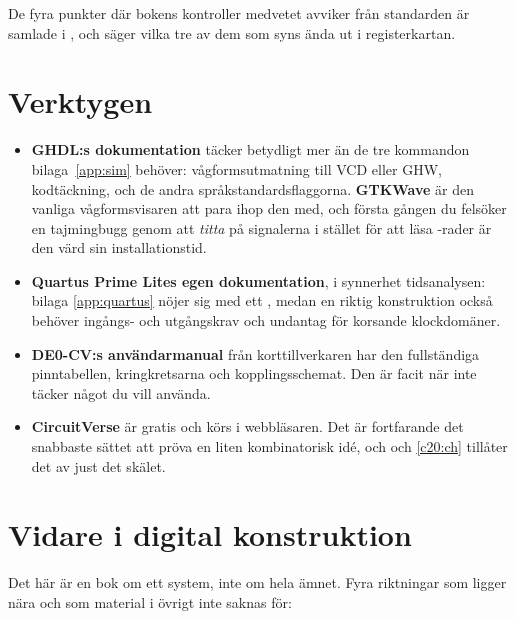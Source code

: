 De fyra punkter där bokens kontroller medvetet avviker från standarden är samlade i
, och  säger vilka tre av dem som syns ända ut i
registerkartan.

\section{Verktygen}
\label{app:reading:tools}

\begin{itemize}
  \item \textbf{GHDL:s dokumentation} täcker betydligt mer än de tre kommandon bilaga~\ref{app:sim}
    behöver: vågformsutmatning till VCD eller GHW, kodtäckning, och de andra
    språkstandardsflaggorna. \textbf{GTKWave} är den vanliga vågformsvisaren att para ihop den med,
    och första gången du felsöker en tajmingbugg genom att \emph{titta} på signalerna i stället för
    att läsa -rader är den värd sin installationstid.
  \item \textbf{Quartus Prime Lites egen dokumentation}, i synnerhet tidsanalysen: bilaga
    \ref{app:quartus} nöjer sig med ett , medan en riktig konstruktion också
    behöver ingångs- och utgångskrav och undantag för korsande klockdomäner.
  \item \textbf{DE0-CV:s användarmanual} från korttillverkaren har den fullständiga pinntabellen,
    kringkretsarna och kopplingsschemat. Den är facit när  inte täcker något du vill
    använda.
  \item \textbf{CircuitVerse} är gratis och körs i webbläsaren. Det är fortfarande det snabbaste
    sättet att pröva en liten kombinatorisk idé, och  och \ref{c20:ch} tillåter det
    av just det skälet.
\end{itemize}

\section{Vidare i digital konstruktion}
\label{app:reading:design}

Det här är en bok om ett system, inte om hela ämnet. Fyra riktningar som ligger nära och som
material i övrigt inte saknas för:

